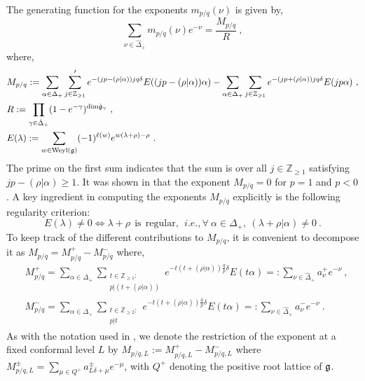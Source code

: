 The generating function for the exponents $m_{p/q}(\nu)$ is given by,
\begin{equation} \label{eq:multAKMmain}
    \sum_{\nu \in \hat{\Delta}_+} m_{p/q}(\nu) e^{-\nu} = \frac{M_{p/q}}{R}~,
\end{equation}
where,
\begin{equation}
\begin{split}
    &M_{p/q} := \sum_{\alpha \in \Delta_+} \sum_{j \in \mathbb{Z}_{\geqslant 1}}^{\prime} e^{-(jp-(\rho|\alpha))jq \delta} E((jp - (\rho|\alpha))\alpha) - \sum_{\alpha \in \Delta_+} \sum_{j \in \mathbb{Z}_{\geqslant 1}} e^{-(jp+(\rho|\alpha))jq \delta} E(jp\alpha)~, \\ 
    &R := \prod_{\gamma \in \hat{\Delta}_+} (1-e^{-\gamma})^{\text{dim} \hat{\mathfrak{g}}_\gamma}~, \\ 
    &E(\lambda) := \sum_{w \in \text{Weyl}(\mathfrak{g})} (-1)^{\ell(w)} e^{w(\lambda + \rho)-\rho}~.
\end{split}
\end{equation}
The prime on the first sum indicates that the sum is over all $j \in \mathbb{Z}_{\geqslant 1}$ satisfying $j p -(\rho|\alpha) \geqslant 1$. It was shown in \cite{gorelik2007simplicity} that the exponent $M_{p/q} = 0$ for $p = 1$ and $p < 0$. A key ingredient in computing the exponents $M_{p/q}$ explicitly is the following regularity criterion:
\begin{equation} \label{eq:ADEregularity}
    E(\lambda) \neq 0 \Longleftrightarrow \lambda+\rho \ \ \mathrm{is} \ \ \mathrm{regular}, \ \ i.e., \forall \ \alpha \in \Delta_+, \ (\lambda + \rho|\alpha) \neq 0~. 
\end{equation}
To keep track of the different contributions to $M_{p/q}$, it is convenient to decompose it as $M_{p/q} = M_{p/q}^+ - M_{p/q}^-$ where,
\begin{equation} \label{eq:splitM}
\begin{split}
    &M_{p/q}^+ = \sum_{\alpha \in \Delta_+} \sum_{\substack{t \in \mathbb{Z}_{\geqslant 1}: \\ p|(t+(\rho|\alpha))}} e^{-t(t+(\rho|\alpha))\frac{q} {p}\delta} E(t \alpha) =: \sum_{\nu \in \hat{\Delta}_+} a^+_\nu e^{-\nu}~, \\
    &M_{p/q}^- = \sum_{\alpha \in \Delta_+} \sum_{\substack{t \in \mathbb{Z}_{\geqslant 2}: \\ p|t}} e^{-t(t+(\rho|\alpha))\frac{q}{p}\delta} E(t \alpha)  =: \sum_{\nu \in \hat{\Delta}_+} a^-_\nu e^{-\nu}~.
\end{split}
\end{equation}
As with the notation used in \cite{ArabiArdehali:2025fad}, we denote the restriction of the exponent at a fixed conformal level $L$ by $M_{p/q,L} := M^{+}_{p/q,L} - M^{-}_{p/q,L}$ where $M^\pm_{p/q, L} = \sum_{\mu \in Q^+} a^\pm_{L\delta + \mu} e^{-\mu}$, with $Q^+$ denoting the positive root lattice of $\mathfrak{g}$.  

